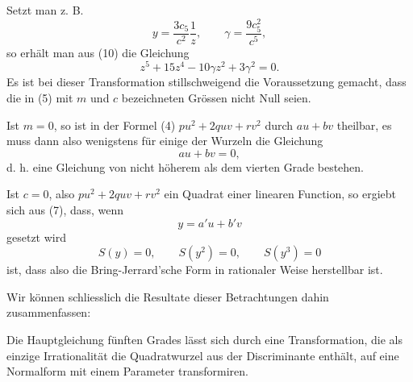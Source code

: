 \documentclass[11pt]{article}
\begin{document}
Setzt man z. B.
\begin{equation}
 y=\frac{3c_5}{c^2}\frac1z,
 \qquad
 \gamma=\frac{9c_5^2}{c^5},
\tag{13}
\end{equation}
so erhält man aus (10) die Gleichung
\begin{equation}
 z^5+15z^4-10\gamma z^2+3\gamma^2=0.
\tag{14}
\end{equation}
Es ist bei dieser Transformation stillschweigend die Voraussetzung gemacht, dass die in (5) mit $m$ und $c$ bezeichneten Grössen nicht Null seien.

Ist $m=0$, so ist in der Formel (4) $pu^2+2quv+rv^2$ durch $au+bv$ theilbar, es muss dann also wenigstens für einige der Wurzeln die Gleichung
\[
 au+bv=0,
\]
d. h. eine Gleichung von nicht höherem als dem vierten Grade bestehen.

Ist $c=0$, also $pu^2+2quv+rv^2$ ein Quadrat einer linearen Function, so ergiebt sich aus (7), dass, wenn
\[
 y=a'u+b'v
\]
gesetzt wird
\[
 S(y)=0,\qquad S(y^2)=0,
 \qquad S(y^3)=0
\]
ist, dass also die Bring-Jerrard'sche Form in rationaler Weise herstellbar ist.

Wir können schliesslich die Resultate dieser Betrachtungen dahin zusammenfassen:

Die Hauptgleichung fünften Grades lässt sich durch eine Transformation, die als einzige Irrationalität die Quadratwurzel aus der Discriminante enthält, auf eine Normalform mit einem Parameter transformiren.
\end{document}

